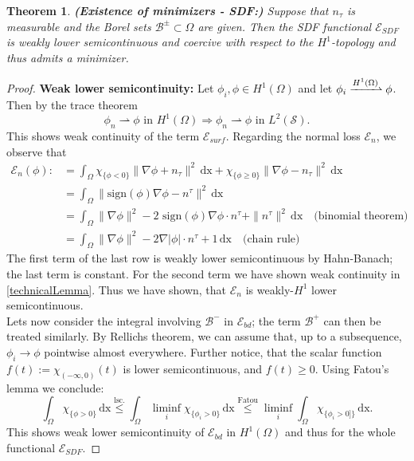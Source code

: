 \documentclass[12pt,openany]{book}
\def\S{\mathcal{S}}
\theoremstyle{plainnormal}
\newtheorem{theorem}{Theorem}[section]
\theoremstyle{remark}
\begin{document}
\begin{theorem}\label{ProofExSDF}\textbf{(Existence of minimizers - SDF:)} 
Suppose that $n_\tau$ is measurable and the Borel sets $\mathcal{B}^{\pm}\subset \Omega$ are given. Then the SDF functional $\mathcal{E}_{SDF}$ is weakly lower semicontinuous and coercive with respect to the $H^1$-topology and thus admits a minimizer. 
\end{theorem}\begin{proof} \textbf{Weak lower semicontinuity:}
Let $\phi_i, \phi \in H^1(\Omega)$ and let $\phi_i \xrightharpoonup{H^1(\Omega)}\phi$. Then by the trace theorem $$\phi_n \rightharpoonup\phi \text{ in }H^1(\Omega) \Rightarrow \phi_n \rightharpoonup\phi \text{ in }L^2(\S).$$
This shows weak continuity of the term $\mathcal{E}_{surf}$. Regarding the normal loss $\mathcal{E}_n$, we observe that \begin{align*}
    \mathcal{E}_n(\phi) :&= \int_\Omega \chi_{\{\phi < 0\}} \|\nabla \phi + n_\tau\|^2 \,\mathrm{dx} + \chi_{\{\phi \geq 0\}} \|\nabla \phi - n_\tau\|^2 \,\mathrm{dx}\\&= \int_\Omega \|\text{sign}(\phi) \nabla \phi - n^\tau\|^ 2\,\mathrm{dx}\\
    & =\int_\Omega \|\nabla \phi\|^2  -2 \text{ sign} (\phi) \nabla \phi \cdot n^\tau  + \|n^\tau\|^2 \,\mathrm{dx} \quad \text{(binomial theorem)}\\
    &= \int_\Omega \|\nabla \phi\|^2  -2 \nabla |\phi| \cdot n^\tau  + 1 \,\mathrm{dx} \quad \text{(chain rule)}
\end{align*}
The first term of the last row is weakly lower semicontinuous by Hahn-Banach; the last term is constant. For the second term we have shown weak continuity in \cref{technicalLemma}. Thus we have shown, that $\mathcal{E}_n$ is weakly-$H^1$ lower semicontinuous.\\
Lets now consider the integral involving $\mathcal{B}^-$ in $\mathcal E_{bd}$; the term $\mathcal B^+$ can then be treated similarly. By Rellichs theorem, we can assume that, up to a subsequence, $\phi_i \rightarrow\phi$ pointwise almost everywhere. Further notice, that the scalar function $f(t) := \chi_{(-\infty, 0)}(t)$ is lower semicontinuous, and $f(t) \geq 0$. Using Fatou's lemma we conclude: $$\int_\Omega  \chi_{\{\phi > 0\}}  \,\mathrm{dx} \overset{\text{lsc.}}{\leq} \int_\Omega \liminf_i  \chi_{\{\phi_i > 0\}}  \,\mathrm{dx} \overset{\text{Fatou}}{\leq} \liminf_i\int_\Omega  \chi_{\{\phi_i > 0]\}}  \,\mathrm{dx}.$$ This shows weak lower semicontinuity of $\mathcal{E}_{bd}$ in $H^1(\Omega)$ and thus for the whole functional $\mathcal{E}_{SDF}.$\par

\end{proof}
\end{document}
